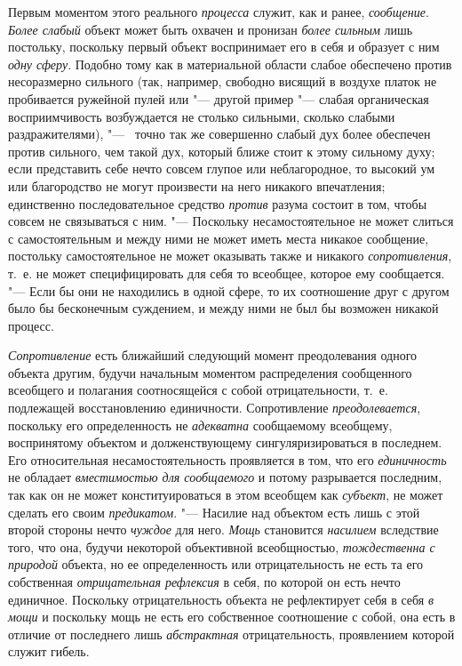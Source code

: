 {{Первым моментом этого реального
{\em процесса} служит,
как и ранее, {\em сообщение}.
{\em Более слабый} объект
может быть охвачен и пронизан {\em более
сильным} лишь постольку, поскольку первый объект
воспринимает его в себя и образует с ним
{\em одну сферу}. Подобно
тому как в материальной области слабое обеспечено против несоразмерно
сильного (так, например, свободно висящий в воздухе платок не пробивается
ружейной пулей или "--- другой пример "--- слабая
органическая восприимчивость возбуждается не столько сильными, сколько
слабыми раздражителями), "--- \ точно так же совершенно слабый
дух более обеспечен против сильного, чем такой дух, который ближе стоит к
этому сильному духу; если представить себе нечто совсем глупое или
неблагородное, то высокий ум или благородство не могут произвести на него
никакого впечатления; единственно последовательное средство
{\em против} разума
состоит в том, чтобы совсем не связываться с ним. "---
Поскольку несамостоятельное не может слиться с
самостоятельным и между ними не может иметь места никакое сообщение,
постольку самостоятельное не может оказывать также и никакого
{\em сопротивления},
т.~е. не может специфицировать для себя то всеобщее, которое
ему сообщается. "--- Если бы они не находились в одной сфере,
то их соотношение друг с другом было бы бесконечным
суждением, и между ними не был бы возможен никакой процесс.

{\em Сопротивление} есть
ближайший следующий момент преодолевания одного объекта другим, будучи
начальным моментом распределения сообщенного всеобщего и полагания
соотносящейся с собой отрицательности, т.~е. подлежащей восстановлению
единичности. Сопротивление
{\em преодолевается},
поскольку его определенность не
{\em адекватна}
сообщаемому всеобщему, воспринятому объектом и
долженствующему сингуляризироваться в последнем. Его относительная
несамостоятельность проявляется в том, что его
{\em единичность} не
обладает {\em вместимостью для
сообщаемого} и потому разрывается последним, так как он не
может конституироваться в этом всеобщем как
{\em субъект}, не может
сделать его своим {\em предикатом}. "---
Насилие над объектом есть лишь с этой второй стороны нечто
{\em чуждое} для него.
{\em Мощь} становится
{\em насилием} вследствие
того, что она, будучи некоторой объективной всеобщностью,
{\em тождественна с природой}
объекта, но ее определенность или отрицательность не есть та
его собственная {\em отрицательная
рефлексия} в себя, по которой он есть нечто единичное.
Поскольку отрицательность объекта не рефлектирует себя в себя
{\em в мощи} и поскольку
мощь не есть его собственное соотношение с собой, она есть в отличие от
последнего лишь {\em абстрактная}
отрицательность, проявлением которой служит гибель.

}}
